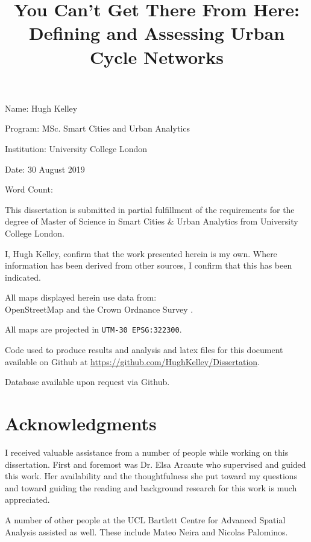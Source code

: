 \documentclass[hidelinks,11pt]{article} %
\title{You Can't Get There From Here: \\Defining and Assessing Urban Cycle Networks}
\author{}
\date{} %
\begin{document}
\maketitle



Name: Hugh Kelley

Program: MSc. Smart Cities and Urban Analytics

Institution: University College London

Date: 30 August 2019

Word Count:

This dissertation is submitted in partial fulfillment of the requirements for the degree of Master of Science in Smart Cities \& Urban Analytics from University College London.

I, Hugh Kelley, confirm that the work presented herein is my own. Where information has been derived from other sources, I confirm that this has been indicated.
\pagebreak

All maps displayed herein use data from: \\
 OpenStreetMap  and the Crown Ordnance Survey .

\medskip
 
All maps are projected in \texttt{UTM-30 EPSG:322300}.

\medskip

Code used to produce results and analysis and latex files for this document available on Github at \url{https://github.com/HughKelley/Dissertation}. 

\medskip

Database available upon request via Github. 

\pagebreak

\section{Acknowledgments}

I received valuable assistance from a number of people while working on this dissertation. First and foremost was Dr. Elsa Arcaute who supervised and guided this work. Her availability and the thoughtfulness she put toward my questions and toward guiding the reading and background research for this work is much appreciated. 

A number of other people at the UCL Bartlett Centre for Advanced Spatial Analysis assisted as well. These include  Mateo Neira and Nicolas Palominos. 
\end{document}
